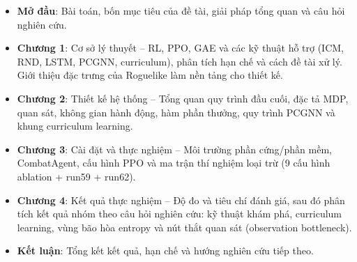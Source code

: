 \vspace{0.3cm}


\renewcommand{\labelitemi}{$-$}
\begin{itemize}
	\item \textbf{Mở đầu}: Bài toán, bốn mục tiêu của đề tài, giải pháp tổng quan và câu hỏi nghiên cứu.
	\item \textbf{Chương 1}: Cơ sở lý thuyết -- RL, PPO, GAE và các kỹ thuật hỗ trợ (ICM, RND, LSTM, PCGNN, curriculum), phân tích hạn chế và cách đề tài xử lý. Giới thiệu đặc trưng của Roguelike làm nền tảng cho thiết kế.
	\item \textbf{Chương 2}: Thiết kế hệ thống -- Tổng quan quy trình đầu cuối, đặc tả MDP, quan sát, không gian hành động, hàm phần thưởng, quy trình PCGNN và khung curriculum learning.
	\item \textbf{Chương 3}: Cài đặt và thực nghiệm -- Môi trường phần cứng/phần mềm, CombatAgent, cấu hình PPO và ma trận thí nghiệm loại trừ (9 cấu hình ablation + run59 + run62).
	\item \textbf{Chương 4}: Kết quả thực nghiệm -- Độ đo và tiêu chí đánh giá, sau đó phân tích kết quả nhóm theo câu hỏi nghiên cứu: kỹ thuật khám phá, curriculum learning, vùng bão hòa entropy và nút thắt quan sát (observation bottleneck).
	\item \textbf{Kết luận}: Tổng kết kết quả, hạn chế và hướng nghiên cứu tiếp theo.
\end{itemize}
